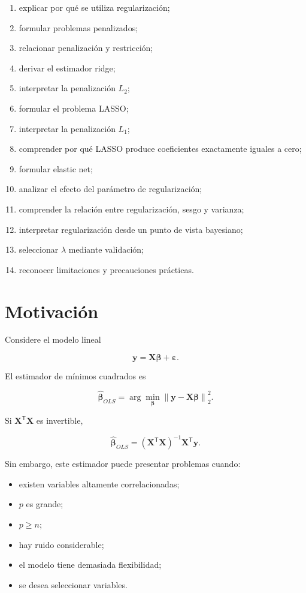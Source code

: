 \documentclass[
  spanish,
  11pt,
  letterpaper,
  DIV=11,
  numbers=noendperiod]{scrreprt}
\providecommand{\tightlist}{%
  \setlength{\itemsep}{0pt}\setlength{\parskip}{0pt}}
\theoremstyle{definition}
\theoremstyle{plain}
\theoremstyle{definition}
\theoremstyle{remark}
\begin{document}
\begin{enumerate}
\def\labelenumi{\arabic{enumi}.}
\tightlist
\item
  explicar por qué se utiliza regularización;
\item
  formular problemas penalizados;
\item
  relacionar penalización y restricción;
\item
  derivar el estimador ridge;
\item
  interpretar la penalización \(L_2\);
\item
  formular el problema LASSO;
\item
  interpretar la penalización \(L_1\);
\item
  comprender por qué LASSO produce coeficientes exactamente iguales a
  cero;
\item
  formular elastic net;
\item
  analizar el efecto del parámetro de regularización;
\item
  comprender la relación entre regularización, sesgo y varianza;
\item
  interpretar regularización desde un punto de vista bayesiano;
\item
  seleccionar \(\lambda\) mediante validación;
\item
  reconocer limitaciones y precauciones prácticas.
\end{enumerate}

\section{Motivación}\label{motivaciuxf3n}

Considere el modelo lineal

\[
\mathbf{y}
=
\mathbf{X}\boldsymbol{\beta}
+
\boldsymbol{\varepsilon}.
\]

El estimador de mínimos cuadrados es

\[
\widehat{\boldsymbol{\beta}}_{OLS}
=
\arg\min_{\boldsymbol{\beta}}
\left\|
\mathbf{y}
-
\mathbf{X}\boldsymbol{\beta}
\right\|_2^2.
\]

Si \(\mathbf{X}^{\mathsf T}\mathbf{X}\) es invertible,

\[
\widehat{\boldsymbol{\beta}}_{OLS}
=
\left(
\mathbf{X}^{\mathsf T}\mathbf{X}
\right)^{-1}
\mathbf{X}^{\mathsf T}\mathbf{y}.
\]

Sin embargo, este estimador puede presentar problemas cuando:

\begin{itemize}
\tightlist
\item
  existen variables altamente correlacionadas;
\item
  \(p\) es grande;
\item
  \(p\geq n\);
\item
  hay ruido considerable;
\item
  el modelo tiene demasiada flexibilidad;
\item
  se desea seleccionar variables.
\end{itemize}
\end{document}
